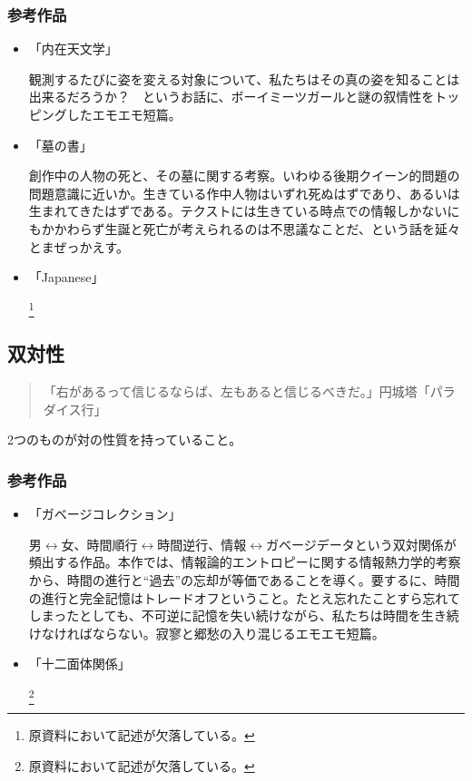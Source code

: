 \documentclass[10pt, a5paper, twoside]{jsarticle}
\begin{document}
			\subsubsection*{参考作品}

				\begin{itemize}
				
					\item 「内在天文学」

						観測するたびに姿を変える対象について、私たちはその真の姿を知ることは出来るだろうか？　というお話に、ボーイミーツガールと謎の叙情性をトッピングしたエモエモ短篇。

					\item 「墓の書」

						創作中の人物の死と、その墓に関する考察。いわゆる後期クイーン的問題の問題意識に近いか。生きている作中人物はいずれ死ぬはずであり、あるいは生まれてきたはずである。テクストには生きている時点での情報しかないにもかかわらず生誕と死亡が考えられるのは不思議なことだ、という話を延々とまぜっかえす。

					\item 「Japanese」

						\footnote{原資料において記述が欠落している。}

				\end{itemize}

		\subsection{双対性}

		\begin{quote}

			「右があるって信じるならば、左もあると信じるべきだ。」\hspace{\fill}円城塔「パラダイス行」

		\end{quote}

			2つのものが対の性質を持っていること。

			\subsubsection{参考作品}


				\begin{itemize}

				\item 「ガベージコレクション」

					男$ \leftrightarrow $女、時間順行$ \leftrightarrow $時間逆行、情報$ \leftrightarrow $ガベージデータという双対関係が頻出する作品。本作では、情報論的エントロピーに関する情報熱力学的考察から、時間の進行と“過去”の忘却が等価であることを導く。要するに、時間の進行と完全記憶はトレードオフということ。たとえ忘れたことすら忘れてしまったとしても、不可逆に記憶を失い続けながら、私たちは時間を生き続けなければならない。寂寥と郷愁の入り混じるエモエモ短篇。

				\item 「十二面体関係」

					\footnote{原資料において記述が欠落している。}

				\end{itemize}
\end{document}
